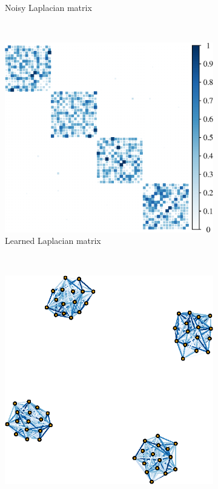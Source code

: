 \documentclass{article}
\begin{document}
\begin{figure}[!htb]
\begin{subfigure}[b]{0.3\textwidth}
        \caption{Noisy Laplacian matrix}
    \end{subfigure}
    ~ %
    \begin{subfigure}[b]{0.3\textwidth}
        \includegraphics[width=\textwidth]{est_mat.eps}
        \caption{Learned Laplacian matrix}
    \end{subfigure}
        \\
    \begin{subfigure}[b]{0.3\textwidth}
        \includegraphics[width=\textwidth]{true_graph.eps}

\end{subfigure}
\end{figure}
\end{document}
